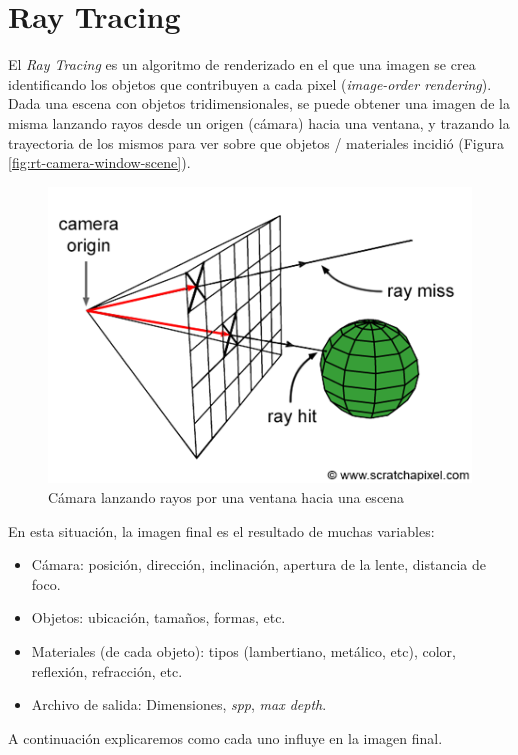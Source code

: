 \section{Ray Tracing} \label{sec:ray-tracing}

El \textit{Ray Tracing} es un algoritmo de renderizado en el que una imagen se
crea identificando los objetos que contribuyen a cada pixel (\textit{image-order
rendering}). Dada una escena con objetos tridimensionales, se puede obtener una
imagen de la misma lanzando rayos desde un origen (cámara) hacia una ventana, y
trazando la trayectoria de los mismos para ver sobre que objetos / materiales
incidió (Figura \ref{fig:rt-camera-window-scene}).

\begin{figure}[H]
    \centering
    \includegraphics[width=.7\textwidth]{imgs/rt-camera-throwing-rays-into-scene.png}
    \caption{Cámara lanzando rayos por una ventana hacia una escena}
    \label{fig:rt-camera-throwing-rays-into-scene}
\end{figure}

En esta situación, la imagen final es el resultado de muchas variables:

\begin{itemize}
    \item Cámara: posición, dirección, inclinación, apertura de la lente,
        distancia de foco.
    \item Objetos: ubicación, tamaños, formas, etc.
    \item Materiales (de cada objeto): tipos (lambertiano, metálico, etc),
    color, reflexión, refracción, etc.
    \item Archivo de salida: Dimensiones, \textit{spp}, \textit{max depth}.
\end{itemize}

A continuación explicaremos como cada uno influye en la imagen final.

